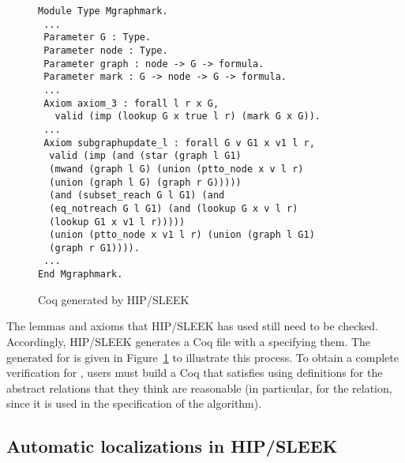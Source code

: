 \begin{figure}[htbp]
  \begin{lstlisting}
Module Type Mgraphmark.
 ...
 Parameter G : Type.
 Parameter node : Type.
 Parameter graph : node -> G -> formula.
 Parameter mark : G -> node -> G -> formula.
 ...
 Axiom axiom_3 : forall l r x G,
   valid (imp (lookup G x true l r) (mark G x G)).
 ...
 Axiom subgraphupdate_l : forall G v G1 x v1 l r,
  valid (imp (and (star (graph l G1)
  (mwand (graph l G) (union (ptto_node x v l r)
  (union (graph l G) (graph r G)))))
  (and (subset_reach G l G1) (and
  (eq_notreach G l G1) (and (lookup G x v l r)
  (lookup G1 x v1 l r)))))
  (union (ptto_node x v1 l r) (union (graph l G1)
  (graph r G1)))).
 ...
End Mgraphmark.
\end{lstlisting}
\caption{Coq  generated by HIP/SLEEK}
\vspace{-2ex}
\label{fig:hipcoqfile}
\end{figure}

The lemmas and axioms that HIP/SLEEK has used still need to be checked.  Accordingly, HIP/SLEEK generates a Coq file with a  specifying them.  The  generated for  is given in Figure~\ref{fig:hipcoqfile} to illustrate this process.  To obtain a complete verification for , users must build a Coq  that satisfies  using definitions for the abstract relations that they think are reasonable (in particular, for the  relation, since it is used in the specification of the algorithm).

\subsection{Automatic localizations in HIP/SLEEK}


